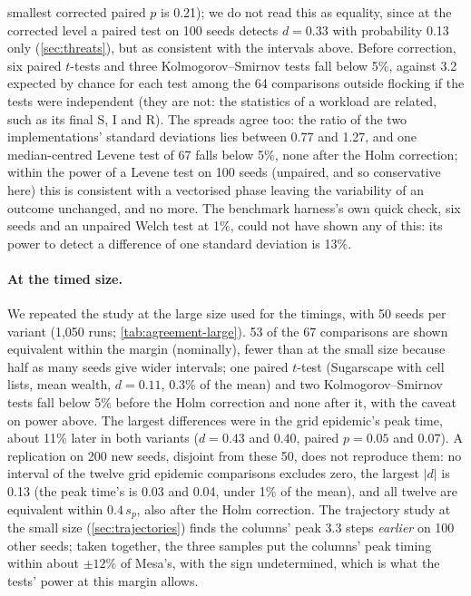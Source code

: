 smallest corrected paired $p$ is 0.21); we do not read this as equality, since at the
corrected level a paired test on 100 seeds detects $d = 0.33$ with probability 0.13 only
(\cref{sec:threats}), but as consistent with the intervals above. Before correction, six
paired $t$-tests and three Kolmogorov--Smirnov tests fall below 5\%, against 3.2 expected by
chance for each test among the 64 comparisons outside flocking if the tests were
independent (they are not: the statistics of a workload are related, such as its final S, I
and R). The spreads agree too: the ratio of the two implementations' standard deviations
lies between 0.77 and 1.27, and one median-centred Levene test \citep{brown1974robust} of 67
falls below 5\%, none after the Holm correction; within the power of a Levene test on 100
seeds (unpaired, and so conservative here) this is consistent with a vectorised phase
leaving the variability of an outcome unchanged, and no more. The benchmark harness's own
quick check, six seeds and an unpaired Welch test \citep{welch1947generalization} at 1\%,
could not have shown any of this: its power to detect a difference of one standard
deviation is 13\%.

\paragraph{At the timed size.} We repeated the study at the large size used for the timings,
with 50 seeds per variant (1,050 runs; \cref{tab:agreement-large}). 53 of the 67
comparisons are shown equivalent within the margin (nominally), fewer than at the small
size because half as many seeds give wider intervals; one paired $t$-test (Sugarscape with
cell lists, mean wealth, $d = 0.11$, 0.3\% of the mean) and two Kolmogorov--Smirnov tests
fall below 5\% before the Holm correction and none after it, with the caveat on power
above. The largest differences were in the grid epidemic's peak time, about 11\% later in
both \modelly{} variants ($d = 0.43$ and $0.40$, paired $p = 0.05$ and $0.07$). A
replication on 200 new seeds, disjoint from these 50, does not reproduce them: no interval
of the twelve grid epidemic comparisons excludes zero, the largest $|d|$ is 0.13 (the peak
time's is 0.03 and 0.04, under 1\% of the mean), and all twelve are equivalent within
$0.4\,s_p$, also after the Holm correction. The trajectory study at the small size
(\cref{sec:trajectories}) finds the columns' peak 3.3 steps \emph{earlier} on 100
other seeds; taken together, the three samples put the columns' peak timing within about
$\pm 12\%$ of Mesa's, with the sign undetermined, which is what the tests' power at this
margin allows.

